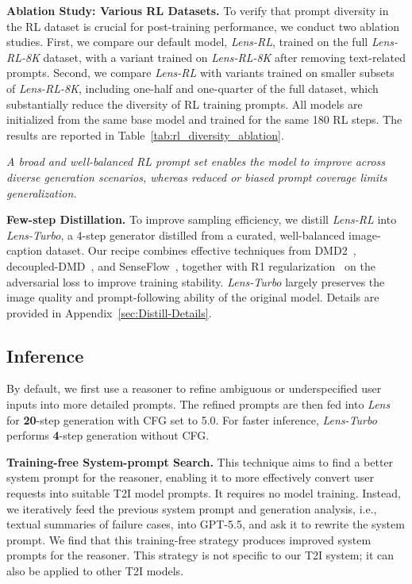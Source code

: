 \documentclass{llmxive}
\begin{document}
\noindent\textbf{Ablation Study: Various RL Datasets.} To verify that prompt diversity in the RL dataset is crucial for post-training performance, we conduct two ablation studies. First, we compare our default model, \textit{Lens-RL}, trained on the full \textit{Lens-RL-8K} dataset, with a variant trained on \textit{Lens-RL-8K} after removing text-related prompts. Second, we compare \textit{Lens-RL} with variants trained on smaller subsets of \textit{Lens-RL-8K}, including one-half and one-quarter of the full dataset, which substantially reduce the diversity of RL training prompts. All models are initialized from the same base model and trained for the same 180 RL steps. The results are reported in Table~\ref{tab:rl_diversity_ablation}.


\begin{tcolorbox}[colback=gray!5,colframe=black]
\textit{A broad and well-balanced RL prompt set enables the model to improve across diverse generation scenarios, whereas reduced or biased prompt coverage limits generalization.}
\end{tcolorbox}

\noindent\textbf{Few-step Distillation.} To improve sampling efficiency, we distill \textit{Lens-RL} into \textit{Lens-Turbo}, a 4-step generator distilled from a curated, well-balanced image-caption dataset. Our recipe combines effective techniques from DMD2~\citep{dmd2}, decoupled-DMD~\citep{decoupleddmd}, and SenseFlow~\citep{senseflow}, together with R1 regularization~\citep{R1penalty, apt} on the adversarial loss to improve training stability. \textit{Lens-Turbo} largely preserves the image quality and prompt-following ability of the original model. Details are provided in Appendix~\ref{sec:Distill-Details}.




\subsection{Inference}
\label{sec:optimization}



By default, we first use a reasoner to refine ambiguous or underspecified user inputs into more detailed prompts. The refined prompts are then fed into \textit{Lens} for \textbf{20}-step generation with CFG set to 5.0. For faster inference, \textit{Lens-Turbo} performs \textbf{4}-step generation without CFG.


\noindent\textbf{Training-free System-prompt Search.}
This technique aims to find a better system prompt for the reasoner, enabling it to more effectively convert user requests into suitable T2I model prompts. It requires no model training. Instead, we iteratively feed the previous system prompt and generation analysis, i.e., textual summaries of failure cases, into GPT-5.5, and ask it to rewrite the system prompt. We find that this training-free strategy produces improved system prompts for the reasoner. This strategy is not specific to our T2I system; it can also be applied to other T2I models.
\end{document}

